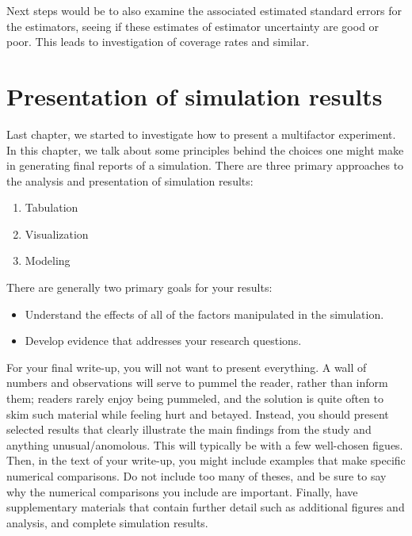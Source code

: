 \documentclass[
]{book}
\providecommand{\tightlist}{%
  \setlength{\itemsep}{0pt}\setlength{\parskip}{0pt}}
\begin{document}
Next steps would be to also examine the associated estimated standard errors
for the estimators, seeing if these estimates of estimator uncertainty are
good or poor. This leads to investigation of coverage rates and similar.

\hypertarget{presentation-of-simulation-results}{%
\chapter{Presentation of simulation results}\label{presentation-of-simulation-results}}

Last chapter, we started to investigate how to present a multifactor experiment.
In this chapter, we talk about some principles behind the choices one might make in generating final reports of a simulation.
There are three primary approaches to the analysis and presentation of simulation results:

\begin{enumerate}
\def\labelenumi{\arabic{enumi}.}
\tightlist
\item
  Tabulation
\item
  Visualization
\item
  Modeling
\end{enumerate}

There are generally two primary goals for your results:

\begin{itemize}
\tightlist
\item
  Understand the effects of all of the factors manipulated in the simulation.
\item
  Develop evidence that addresses your research questions.
\end{itemize}

For your final write-up, you will not want to present everything.
A wall of numbers and observations will serve to pummel the reader, rather than inform them; readers rarely enjoy being pummeled, and the solution is quite often to skim such material while feeling hurt and betayed.
Instead, you should present selected results that clearly illustrate the main findings from the study and anything unusual/anomolous.
This will typically be with a few well-chosen figues.
Then, in the text of your write-up, you might include examples that make specific numerical comparisons.
Do not include too many of theses, and be sure to say why the numerical comparisons you include are important.
Finally, have supplementary materials that contain further detail such as additional figures and analysis, and complete simulation results.
\end{document}
